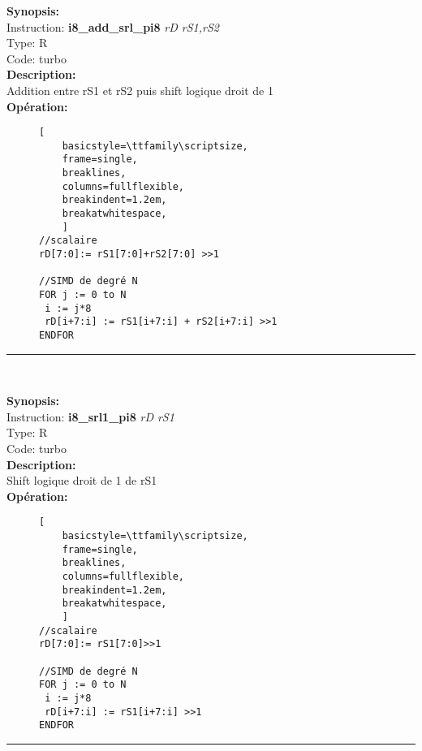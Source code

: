 {\scriptsize
\textbf{Synopsis:}\\
Instruction: \textbf{i8\_add\_srl\_pi8 } \textit{rD rS1,rS2}\\
Type: R\\
Code: turbo\\
\textbf{Description:}\\
Addition entre rS1 et rS2 puis shift logique droit de 1\\
\textbf{Opération:}\\
    \begin{figure}[H]
    \begin{lstlisting}[
    basicstyle=\ttfamily\scriptsize,
    frame=single,
    breaklines,
    columns=fullflexible,
    breakindent=1.2em,
    breakatwhitespace,
    ]
//scalaire
rD[7:0]:= rS1[7:0]+rS2[7:0] >>1
    
//SIMD de degré N
FOR j := 0 to N    
 i := j*8    
 rD[i+7:i] := rS1[i+7:i] + rS2[i+7:i] >>1  
ENDFOR
\end{lstlisting}
\end{figure}
}
\rule{8cm}{0.4pt}\\
{\scriptsize
\textbf{Synopsis:}\\
Instruction: \textbf{i8\_srl1\_pi8 } \textit{rD rS1}\\
Type: R\\
Code: turbo\\
\textbf{Description:}\\
Shift logique droit de 1 de rS1\\
\textbf{Opération:}\\
    \begin{figure}[H]
    \begin{lstlisting}[
    basicstyle=\ttfamily\scriptsize,
    frame=single,
    breaklines,
    columns=fullflexible,
    breakindent=1.2em,
    breakatwhitespace,
    ]
//scalaire
rD[7:0]:= rS1[7:0]>>1
    
//SIMD de degré N
FOR j := 0 to N    
 i := j*8    
 rD[i+7:i] := rS1[i+7:i] >>1  
ENDFOR
\end{lstlisting}
\end{figure}
}
\rule{8cm}{0.4pt}\\

